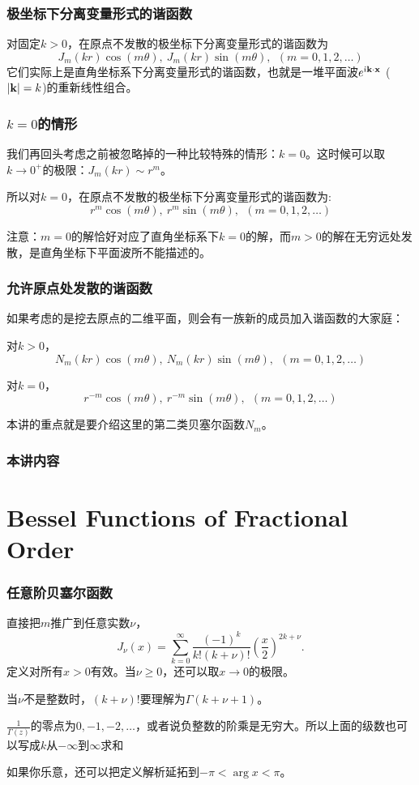 \documentclass[CJK]{beamer}
\date{}
\begin{document}
  \bch
{}


\begin{frame}
  \frametitle{极坐标下分离变量形式的谐函数}
对固定$k>0$，在原点不发散的极坐标下分离变量形式的谐函数为
$$ J_m(kr)\cos(m\theta), \ J_m(kr)\sin(m\theta), \ \ (m=0,1,2,\ldots) $$
它们实际上是直角坐标系下分离变量形式的谐函数，也就是一堆平面波$e^{{\dot{\imath}} {\mathbf{k}} \cdot {\mathbf{x}}}$ ($|{\mathbf{k}}|=k$)的重新线性组合。
\end{frame}


\begin{frame}
  \frametitle{$k=0$的情形}
  我们再回头考虑之前被忽略掉的一种比较特殊的情形：$k=0$。这时候可以取$k\rightarrow 0^+$的极限：$ J_m(kr)\sim  r^m$。

  所以对$k=0$，在原点不发散的极坐标下分离变量形式的谐函数为:
  $$ r^m \cos(m\theta), \ r^m \sin(m\theta), \ \ (m=0,1,2,\ldots)$$

  {\scriptsize 注意：$m=0$的解恰好对应了直角坐标系下$k=0$的解，而$m>0$的解在无穷远处发散，是直角坐标下平面波所不能描述的。}
\end{frame}


\begin{frame}
  \frametitle{允许原点处发散的谐函数}
  如果考虑的是挖去原点的二维平面，则会有一族新的成员加入谐函数的大家庭：
  \bitem
\item{对$k>0$，
  $$N_m(kr)\cos(m\theta), \ N_m(kr)\sin(m\theta), \ \ (m=0,1,2,\ldots) $$}
\item{对$k=0$，
  $$r^{-m} \cos(m\theta), \ r^{-m} \sin(m\theta), \ \ (m=0,1,2,\ldots)$$}
  \eitem

  本讲的重点就是要介绍这里的第二类贝塞尔函数$N_m$。
\end{frame}


\begin{frame}
\frametitle{本讲内容}

\tableofcontents
\end{frame}

\section{Bessel Functions of Fractional Order}

\begin{frame}
\frametitle{任意阶贝塞尔函数}

直接把$m$推广到任意实数$\nu$，
\tbox
    {$$J_\nu(x) = \sum_{k=0}^\infty \frac{(-1)^k}{k!(k+\nu)!} \left(\frac{x}{2}\right)^{2k+\nu}.$$}
    定义对所有$x>0$有效。当$\nu \ge 0$，还可以取$x \rightarrow 0$的极限。


    
    \skiplines
    \bitem
  \item{当$\nu$不是整数时，$(k+\nu)!$要理解为$\Gamma(k+\nu+1)$。}
  \item{$\frac{1}{\Gamma(z)}$的零点为$0,-1,-2,\ldots$，或者说负整数的阶乘是无穷大。所以上面的级数也可以写成$k$从$-\infty$到$\infty$求和}
  \item{如果你乐意，还可以把定义解析延拓到$-\pi<\arg x<\pi$。}
    \eitem

\end{frame}
\end{document}
